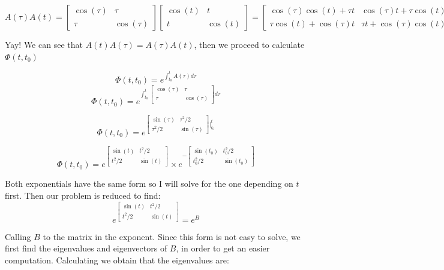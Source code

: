 \documentclass[10pt,a4paper]{article}
\begin{document}
\[A(\tau)A(t) = 
\begin{bmatrix}
\cos (\tau) & \tau \\
\tau & \cos (\tau)
\end{bmatrix}
\begin{bmatrix}
\cos (t) & t \\
t & \cos (t)
\end{bmatrix}
=
\begin{bmatrix}
\cos (\tau)\cos (t) + \tau t & \cos (\tau)t + \tau\cos (t) \\
\tau\cos (t) + \cos (\tau)t & \tau t + \cos (\tau)\cos (t)
\end{bmatrix}
\]

Yay! We can see that $A(t)A(\tau) = A(\tau)A(t)$, then we proceed to calculate $\Phi(t,t_{0})$

\[ \Phi (t,t_{0}) = e^{ \displaystyle \int_{t_{0}}^{t}A(\tau)d\tau } \]
\[ \Phi (t,t_{0}) = e^{ \displaystyle \int_{t_{0}}^{t}
\begin{bmatrix}
\cos (\tau) & \tau \\
\tau & \cos (\tau)
\end{bmatrix}
d\tau } \]

\[ \Phi (t,t_{0}) = e^{ 
\begin{bmatrix}
\sin (\tau) & \tau^{2}/2 \\
\tau^{2}/2 & \sin (\tau)
\end{bmatrix} \Bigg | _{t_{0}}^{t} } 
\]

\begin{equation} 
\Phi (t,t_{0}) = e^{ 
\begin{bmatrix}
\sin (t) & t^{2}/2 \\
t^{2}/2 & \sin (t)
\end{bmatrix} } 
\times
e^{ -
\begin{bmatrix}
\sin (t_{0}) & t_{0}^{2}/2 \\
t_{0}^{2}/2 & \sin (t_{0})
\end{bmatrix} }
\label{Eq:P3-PhiEq}
\end{equation}

Both exponentials have the same form so I will solve for the one depending on $t$ first. Then our problem is reduced to find:
\[ e^{ 
\begin{bmatrix}
\sin (t) & t^{2}/2 \\
t^{2}/2 & \sin (t)
\end{bmatrix} }
= e^{B} 
\]

Calling $B$ to the matrix in the exponent. Since this form is not easy to solve, we first find the eigenvalues and eigenvectors of $B$, in order to get an easier computation. Calculating we obtain that the eigenvalues are:
\end{document}
